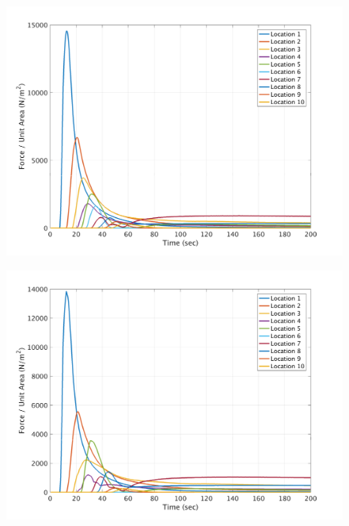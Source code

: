 \documentclass[a4paper,10pt]{article}
\begin{document}
\begin{figure}[H]

	\begin{minipage}[b]{0.5\linewidth}
	\centering
    \includegraphics[width=1\textwidth]{MeansAll/FgravC_all.png}     
        \label{fig:M_FgCall}
	\end{minipage}
	\begin{minipage}[b]{0.5\linewidth}
	\centering
    \includegraphics[width=1\textwidth]{MeansAll/FbedC_all.png}     
        \label{fig:M_FbCall}
	\end{minipage}
	

\end{figure}
\end{document}
